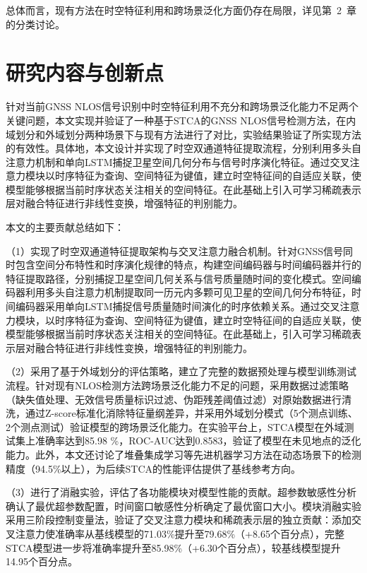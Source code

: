     总体而言，现有方法在时空特征利用和跨场景泛化方面仍存在局限，详见第~2~章的分类讨论。

\section{研究内容与创新点}

    针对当前GNSS NLOS信号识别中时空特征利用不充分和跨场景泛化能力不足两个关键问题，本文实现并验证了一种基于STCA的GNSS NLOS信号检测方法，在内域划分和外域划分两种场景下与现有方法进行了对比，实验结果验证了所实现方法的有效性。具体地，本文设计并实现了时空双通道特征提取流程，分别利用多头自注意力机制和单向LSTM捕捉卫星空间几何分布与信号时序演化特征。通过交叉注意力模块以时序特征为查询、空间特征为键值，建立时空特征间的自适应关联，使模型能够根据当前时序状态关注相关的空间特征。在此基础上引入可学习稀疏表示层对融合特征进行非线性变换，增强特征的判别能力。

    本文的主要贡献总结如下：

    （1）实现了时空双通道特征提取架构与交叉注意力融合机制。针对GNSS信号同时包含空间分布特性和时序演化规律的特点，构建空间编码器与时间编码器并行的特征提取路径，分别捕捉卫星空间几何关系与信号质量随时间的变化模式。空间编码器利用多头自注意力机制提取同一历元内多颗可见卫星的空间几何分布特征，时间编码器采用单向LSTM捕捉信号质量随时间演化的时序依赖关系。通过交叉注意力模块，以时序特征为查询、空间特征为键值，建立时空特征间的自适应关联，使模型能够根据当前时序状态关注相关的空间特征。在此基础上，引入可学习稀疏表示层对融合特征进行非线性变换，增强特征的判别能力。

    （2）采用了基于外域划分的评估策略，建立了完整的数据预处理与模型训练测试流程。针对现有NLOS检测方法跨场景泛化能力不足的问题，采用数据过滤策略（缺失值处理、无效信号质量标识过滤、伪距残差阈值过滤）对原始数据进行清洗，通过Z-score标准化消除特征量纲差异，并采用外域划分模式（5个测点训练、2个测点测试）验证模型的跨场景泛化能力。在实验平台上，STCA模型在外域测试集上准确率达到85.98 \%，ROC-AUC达到0.8583，验证了模型在未见地点的泛化能力。此外，本文还讨论了堆叠集成学习等先进机器学习方法在动态场景下的检测精度（94.5\%以上），为后续STCA的性能评估提供了基线参考方向。

    （3）进行了消融实验，评估了各功能模块对模型性能的贡献。超参数敏感性分析确认了最优超参数配置，时间窗口敏感性分析确定了最优窗口大小。模块消融实验采用三阶段控制变量法，验证了交叉注意力模块和稀疏表示层的独立贡献：添加交叉注意力使准确率从基线模型的71.03\%提升至79.68\%（+8.65个百分点），完整STCA模型进一步将准确率提升至85.98\%（+6.30个百分点），较基线模型提升14.95个百分点。

